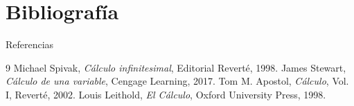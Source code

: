 \documentclass[10pt, spanish]{beamer}
\begin{document}
	\section{Bibliografía}
	\begin{frame}{Referencias}
		\begin{thebibliography}{9}
			 Michael Spivak, \textit{Cálculo infinitesimal}, Editorial Reverté, 1998.
			 James Stewart, \textit{Cálculo de una variable}, Cengage Learning, 2017.
			 Tom M. Apostol, \textit{Cálculo}, Vol. I, Reverté, 2002.
			 Louis Leithold, \textit{El Cálculo}, Oxford University Press, 1998.
		\end{thebibliography}
	\end{frame}
	
\end{document}
